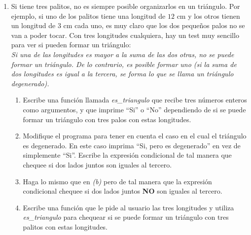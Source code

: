 \documentclass[10pt, twocolumn]{article}
\begin{document}
\begin{enumerate}
	\item Si tiene tres palitos, no es siempre posible organizarlos en un triángulo. Por ejemplo, si uno de los palitos tiene una longitud de $12$ cm y los otros tienen un longitud de $3$ cm cada uno, es muy claro que los dos pequeños palos no se van a poder tocar. Con tres longitudes cualquiera, hay un test muy sencillo para ver si pueden formar un triángulo:\\
	\vskip -4mm
	\emph{Si una de las longitudes es mayor a la suma de las dos otras, no se puede formar un triángulo. De lo contrario, es posible formar uno (si la suma de dos longitudes es igual a la tercera, se forma lo que se llama un triángulo degenerado).}
	\begin{enumerate}
		\item Escribe una función llamada \emph{es\_triangulo} que recibe tres números enteros como argumentos, y que imprime ``Si'' o ``No'' dependiendo de si se puede formar un triángulo con tres palos con estas longitudes. 
		\item Modifique el programa para tener en cuenta el caso en el cual el triángulo es degenerado. En este caso imprima ``Si, pero es degenerado'' en vez de simplemente ``Si''. Escribe la expresión condicional de tal manera que chequee si dos lados juntos son iguales al tercero.
		\item Haga lo mismo que en \emph{(b)} pero de tal manera que la expresión condicional chequee si dos lados juntos \textbf{NO} son iguales al tercero. 
		\item Escribe una función que le pide al usuario las tres longitudes y utiliza \emph{es\_triangulo} para chequear si se puede formar un triángulo con tres palitos con estas longitudes.
	\end{enumerate}



\end{enumerate}
\end{document}
